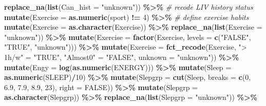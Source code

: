 \documentclass[
]{article}
\newenvironment{Shaded}{\begin{snugshade}}{\end{snugshade}}
\newcommand{\CommentTok}[1]{\textcolor[rgb]{0.56,0.35,0.01}{\textit{#1}}}
\newcommand{\DataTypeTok}[1]{\textcolor[rgb]{0.13,0.29,0.53}{#1}}
\newcommand{\DecValTok}[1]{\textcolor[rgb]{0.00,0.00,0.81}{#1}}
\newcommand{\FloatTok}[1]{\textcolor[rgb]{0.00,0.00,0.81}{#1}}
\newcommand{\KeywordTok}[1]{\textcolor[rgb]{0.13,0.29,0.53}{\textbf{#1}}}
\newcommand{\NormalTok}[1]{#1}
\newcommand{\OperatorTok}[1]{\textcolor[rgb]{0.81,0.36,0.00}{\textbf{#1}}}
\newcommand{\OtherTok}[1]{\textcolor[rgb]{0.56,0.35,0.01}{#1}}
\newcommand{\StringTok}[1]{\textcolor[rgb]{0.31,0.60,0.02}{#1}}
\begin{document}
\begin{Shaded}
\begin{Highlighting}[]
\StringTok{  }\KeywordTok{replace\_na}\NormalTok{(}\KeywordTok{list}\NormalTok{(}\DataTypeTok{Can\_hist =} \StringTok{"unknown"}\NormalTok{)) }\OperatorTok{\%\textgreater{}\%}\StringTok{ }\CommentTok{\# recode LIV history status}
\StringTok{  }\KeywordTok{mutate}\NormalTok{(}\DataTypeTok{Exercise =} \KeywordTok{as.numeric}\NormalTok{(sport) }\OperatorTok{!=}\StringTok{ }\DecValTok{4}\NormalTok{) }\OperatorTok{\%\textgreater{}\%}\StringTok{ }\CommentTok{\# define exercise habits}
\StringTok{  }\KeywordTok{mutate}\NormalTok{(}\DataTypeTok{Exercise =} \KeywordTok{as.character}\NormalTok{(Exercise)) }\OperatorTok{\%\textgreater{}\%}\StringTok{ }
\StringTok{  }\KeywordTok{replace\_na}\NormalTok{(}\KeywordTok{list}\NormalTok{(}\DataTypeTok{Exercise =} \StringTok{"unknown"}\NormalTok{)) }\OperatorTok{\%\textgreater{}\%}\StringTok{ }
\StringTok{  }\KeywordTok{mutate}\NormalTok{(}\DataTypeTok{Exercise =} \KeywordTok{factor}\NormalTok{(Exercise, }\DataTypeTok{levels =} \KeywordTok{c}\NormalTok{(}\StringTok{"FALSE"}\NormalTok{, }\StringTok{"TRUE"}\NormalTok{, }\StringTok{"unknown"}\NormalTok{))) }\OperatorTok{\%\textgreater{}\%}\StringTok{ }
\StringTok{  }\KeywordTok{mutate}\NormalTok{(}\DataTypeTok{Exercise =} \KeywordTok{fct\_recode}\NormalTok{(Exercise, }
                               \StringTok{"\textgreater{} 1h/w"}\NormalTok{ =}\StringTok{ "TRUE"}\NormalTok{, }
                               \StringTok{"Almost0"}\NormalTok{ =}\StringTok{ "FALSE"}\NormalTok{, }
                               \DataTypeTok{unknown   =} \StringTok{"unknown"}\NormalTok{)) }\OperatorTok{\%\textgreater{}\%}\StringTok{ }
\StringTok{  }\KeywordTok{mutate}\NormalTok{(}\DataTypeTok{Engy =} \KeywordTok{log}\NormalTok{(}\KeywordTok{as.numeric}\NormalTok{(ENERGY))) }\OperatorTok{\%\textgreater{}\%}\StringTok{ }
\StringTok{  }\KeywordTok{mutate}\NormalTok{(}\DataTypeTok{Sleep =} \KeywordTok{as.numeric}\NormalTok{(SLEEP)}\OperatorTok{/}\DecValTok{10}\NormalTok{) }\OperatorTok{\%\textgreater{}\%}\StringTok{ }
\StringTok{  }\KeywordTok{mutate}\NormalTok{(}\DataTypeTok{Slepgrp =} \KeywordTok{cut}\NormalTok{(Sleep, }\DataTypeTok{breaks =} \KeywordTok{c}\NormalTok{(}\DecValTok{0}\NormalTok{, }\FloatTok{6.9}\NormalTok{, }\FloatTok{7.9}\NormalTok{, }\FloatTok{8.9}\NormalTok{, }\DecValTok{23}\NormalTok{), }\DataTypeTok{right =} \OtherTok{FALSE}\NormalTok{)) }\OperatorTok{\%\textgreater{}\%}\StringTok{ }
\StringTok{  }\KeywordTok{mutate}\NormalTok{(}\DataTypeTok{Slepgrp =} \KeywordTok{as.character}\NormalTok{(Slepgrp)) }\OperatorTok{\%\textgreater{}\%}\StringTok{ }
\StringTok{  }\KeywordTok{replace\_na}\NormalTok{(}\KeywordTok{list}\NormalTok{(}\DataTypeTok{Slepgrp =} \StringTok{"unknown"}\NormalTok{)) }\OperatorTok{\%\textgreater{}\%}\StringTok{ }

\end{Highlighting}
\end{Shaded}
\end{document}

